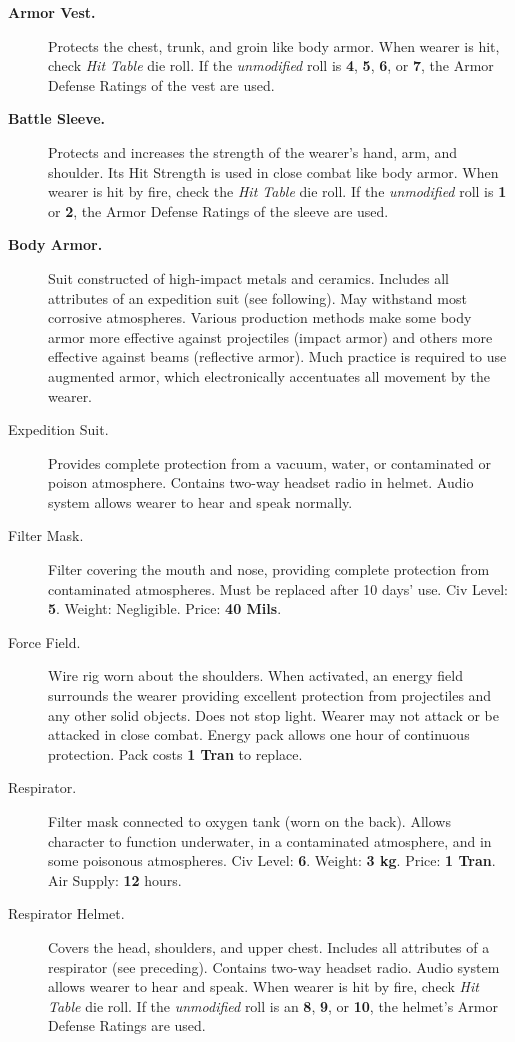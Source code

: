 \begin{description}
\item[\textbf{\hypertarget{tag:armor-vest}{Armor Vest}.}] Protects the chest, trunk, and groin like body
  armor. When wearer is hit, check \emph{Hit Table} die roll. If the
  \emph{unmodified} roll is \textbf{4}, \textbf{5}, \textbf{6}, or
  \textbf{7}, the Armor Defense Ratings of the vest are used.
\item[\textbf{Battle Sleeve.}] Protects and increases the strength of the
  wearer's hand, arm, and shoulder.  Its Hit Strength is used in close
  combat like body armor.  When wearer is hit by fire, check the
  \emph{Hit Table} die roll. If the \emph{unmodified} roll is
  \textbf{1} or \textbf{2}, the Armor Defense Ratings of the sleeve
  are used.
\item[\textbf{\hypertarget{tag:body-armor}{Body Armor}.}] Suit constructed of high-impact metals and
  ceramics. Includes all attributes of an expedition suit (see
  following). May withstand most corrosive atmospheres. Various
  production methods make some body armor more effective against
  projectiles (impact armor) and others more effective against beams
  (reflective armor). Much practice is required to use augmented
  armor, which electronically accentuates all movement by the wearer.
\item[\hypertarget{tag:expedsuit}{Expedition Suit}.] Provides complete protection from a
  vacuum, water, or contaminated or poison atmosphere. Contains
  two-way headset radio in helmet. Audio system allows wearer to hear
  and speak normally.
\item[Filter Mask.] Filter covering the mouth and nose, providing
  complete protection from contaminated atmospheres. Must be replaced
  after 10 days' use. Civ Level: \textbf{5}. Weight: Negligible. Price:
  \textbf{40 Mils}.
\item[Force Field.] Wire rig worn about the shoulders. When activated,
  an energy field surrounds the wearer providing excellent protection
  from projectiles and any other solid objects. Does not stop light.
  Wearer may not attack or be attacked in close combat. Energy pack
  allows one hour of continuous protection. Pack costs \textbf{1 Tran}
  to replace.
\item[\hypertarget{tag:respirator}{Respirator}.] Filter mask connected to oxygen tank (worn on the
  back). Allows character to function underwater, in a contaminated
  atmosphere, and in some poisonous atmospheres. Civ Level:
  \textbf{6}.  Weight: \textbf{3 kg}. Price: \textbf{1 Tran}. Air
  Supply: \textbf{12} hours.
\item[\hypertarget{tag:respirator-helmet}{Respirator Helmet}.] Covers the head, shoulders, and upper chest.
  Includes all attributes of a respirator (see preceding).  Contains
  two-way headset radio. Audio system allows wearer to hear and speak.
  When wearer is hit by fire, check \emph{Hit Table} die roll. If the
  \emph{unmodified} roll is an \textbf{8}, \textbf{9}, or \textbf{10},
  the helmet's Armor Defense Ratings are used.
\end{description}

